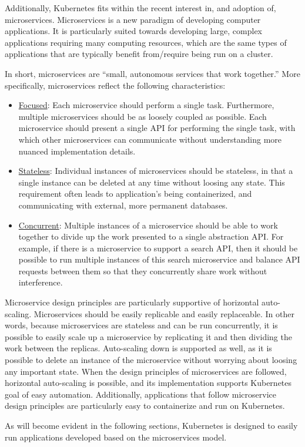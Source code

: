Additionally, Kubernetes fits within the recent interest in, and adoption of,
microservices. Microservices is a new paradigm of developing computer
applications. It is particularly suited towards developing large, complex
applications requiring many computing resources, which are the
same types of applications that are typically benefit from/require
being run on a cluster.

In short, microservices are ``small, autonomous services that work
together.''\cite[pg. 2]{building-microservices-designing-fine-grained-systems}
More specifically, microservices reflect the following characteristics:

\begin{itemize}
  \item \underline{Focused}: Each microservice should perform a single task.
    Furthermore, multiple microservices should be as loosely coupled as
    possible. Each microservice should present a single API for performing the
    single task, with which other microservices can communicate without
    understanding more nuanced implementation
    details.\cite{building-microservices-designing-fine-grained-systems}
  \item \underline{Stateless}: Individual instances of microservices should be stateless, in
    that a single instance can be deleted at any time without loosing any state.
    This requirement often leads to application's being containerized, and
    communicating with external, more permanent databases.
  \item \underline{Concurrent}: Multiple instances of a microservice should be
    able to work together to divide up the work presented to a single
    abstraction API. For example, if there is a microservice to support
    a search API, then it should be possible to run multiple instances of this
    search microservice and balance API requests between them so that they
    concurrently share work without interference.
\end{itemize}

Microservice design principles are particularly supportive of horizontal
auto-scaling. Microservices should be easily replicable and easily replaceable.
In other words, because microservices are stateless and can be run concurrently,
it is possible to easily scale up a microservice by replicating it and then
dividing the work between the replicas. Auto-scaling down is supported as well, as it is
possible to delete an instance of the microservice without worrying about
loosing any important state. When the design principles of
microservices are followed, horizontal auto-scaling is possible, and its
implementation supports Kubernetes goal of easy automation. Additionally,
applications that follow microservice design principles are particularly easy to
containerize and run on Kubernetes.

As will become evident in the following sections, Kubernetes is designed to
easily run applications developed based on the microservices model.
